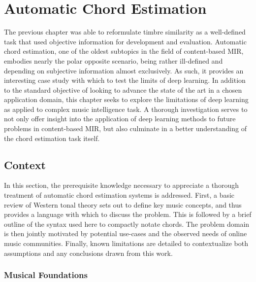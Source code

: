\graphicspath{{5/figures/}}

\chapter{Automatic Chord Estimation}
\label{chp:chord_estimation}

The previous chapter was able to reformulate timbre similarity as a well-defined task that used objective information for development and evaluation.
Automatic chord estimation, one of the oldest subtopics in the field of content-based MIR, embodies nearly the polar opposite scenario, being rather ill-defined and depending on subjective information almost exclusively.
As such, it provides an interesting case study with which to test the limits of deep learning.
In addition to the standard objective of looking to advance the state of the art in a chosen application domain, this chapter seeks to explore the limitations of deep learning as applied to complex music intelligence task.
A thorough investigation serves to not only offer insight into the application of deep learning methods to future problems in content-based MIR, but also culminate in a better understanding of the chord estimation task itself.


\section{Context}
\label{sec:context}

In this section, the prerequisite knowledge necessary to appreciate a thorough treatment of automatic chord estimation systems is addressed.
First, a basic review of Western tonal theory sets out to define key music concepts, and thus provides a language with which to discuss the problem.
This is followed by a brief outline of the syntax used here to compactly notate chords.
The problem domain is then jointly motivated by potential use-cases and the observed needs of online music communities.
Finally, known limitations are detailed to contextualize both assumptions and any conclusions drawn from this work.



\subsection{Musical Foundations}
\label{subsec:musical_foundations}

